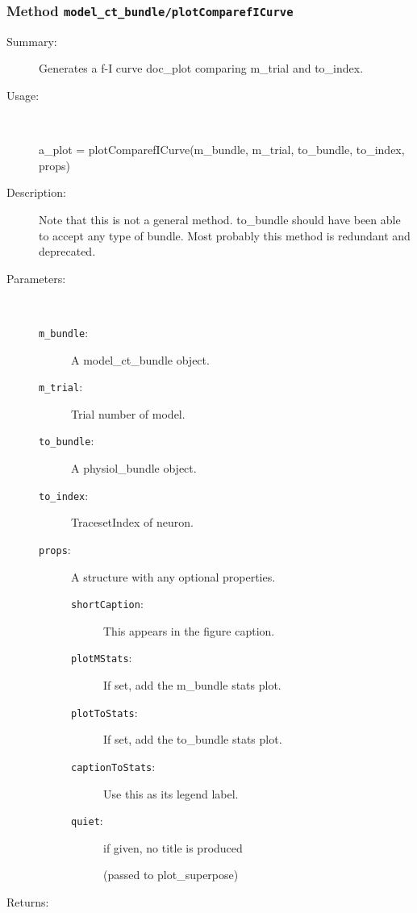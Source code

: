\subsubsection[Method \texttt{plotComparefICurve}]{Method \texttt{model\_ct\_bundle/plotComparefICurve}}%
%
\label{ref_model_ct_bundle__plotComparefICurve}%
\hypertarget{ref_model_ct_bundle__plotComparefICurve}{}%
\begin{description}
\item[Summary:]Generates a f-I curve doc\_plot comparing m\_trial and to\_index.
%
\item[Usage:]~%
\begin{lyxcode}%
a\_plot = plotComparefICurve(m\_bundle, m\_trial, to\_bundle, to\_index, props)
%
\end{lyxcode}%
%
\item[Description:]%
Note that this is not a general method. to\_bundle should have been able to accept
 any type of bundle. Most probably this method is redundant and deprecated.
\item[Parameters:]~
\begin{description}%
\item[\texttt{m\_bundle}:]
 A model\_ct\_bundle object.
\item[\texttt{m\_trial}:]
 Trial number of model.
\item[\texttt{to\_bundle}:]
 A physiol\_bundle object.
\item[\texttt{to\_index}:]
 TracesetIndex of neuron.
\item[\texttt{props}:]
 A structure with any optional properties.
\begin{description}%
\item[\texttt{shortCaption}:]
 This appears in the figure caption.
\item[\texttt{plotMStats}:]
 If set, add the m\_bundle stats plot.
\item[\texttt{plotToStats}:]
 If set, add the to\_bundle stats plot.
\item[\texttt{captionToStats}:]
 Use this as its legend label. 
\item[\texttt{quiet}:]
 if given, no title is produced

(passed to plot\_superpose)
\end{description}%
\end{description}%
%
\item[Returns:
]~


\end{description}
